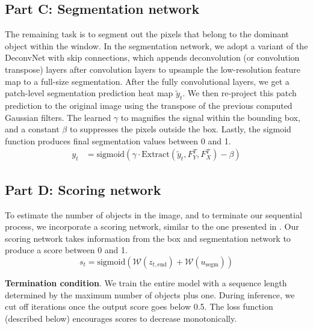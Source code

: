 \subsection{Part C: Segmentation network}

The remaining task is to segment out the pixels that belong to the dominant
object within the window. In the segmentation network, we adopt a variant of
the DeconvNet \cite{noh15deconv} with skip connections, which appends
deconvolution (or convolution transpose) layers after convolution layers to
upsample the low-resolution feature map to a full-size segmentation. After the
fully convolutional layers, we get a patch-level segmentation prediction heat
map $\tilde{y}_t$. We then re-project this patch prediction to the original
image using the transpose of the previous computed Gaussian filters. The
learned $\gamma$ to magnifies the signal within the bounding box, and a
constant $\beta$ to suppresses the pixels outside the box. Lastly, the sigmoid
function produces final segmentation values between 0 and 1.
\begin{align}
y_t &= \text{sigmoid} \left(
\gamma \cdot \text{Extract}(\tilde{y}_t, F_Y^T, F_X^T)
- \beta \right)
\end{align}

\subsection{Part D: Scoring network}

To estimate the number of objects in the image, and to terminate our sequential
process, we incorporate a scoring network, similar to the one presented in
\cite{romeraparedes15ris}. Our scoring network takes information from the box
and segmentation network to produce a score between 0 and 1.
\begin{equation}
s_{t} = \text{sigmoid}(\mathcal{W}(z_{t, \text{end}}) + \mathcal{W}(u_{\text{segm}}))
\end{equation}

\textbf{Termination condition}. We train the entire model with a sequence length
determined by the maximum number of objects plus one. During inference, we cut
off iterations once the output score goes below 0.5. The loss function
(described below) encourages scores to decrease monotonically.

